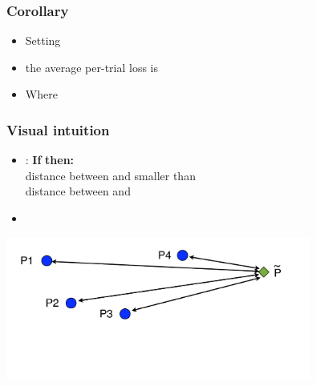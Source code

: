 \documentclass[handout]{beamer}
\begin{document}
\begin{frame}
\frametitle{Corollary}
\begin{itemize}
\item Setting 
\item the average per-trial loss is
\item Where 
\R{\[
\delt = \sqrt{2 \ln n \over T} + {\ln n \over T} 
= O\paren{\sqrt{\frac{\ln n}{T}}}.
\]}
\end{itemize}
\end{frame}



\begin{frame}
  \frametitle{Visual intuition}
  \begin{itemize}
  \item \R{$\ouralg$} : {\bf If}  {\bf then:} \\
    distance between  and \R{$\Pref$} smaller than \\
    distance between  and \R{$\Pref$}
    
  \item
  \end{itemize}
  \includegraphics[width=10cm]{figures/divergenceAnalysis.pdf}
\end{frame}
\end{document}
